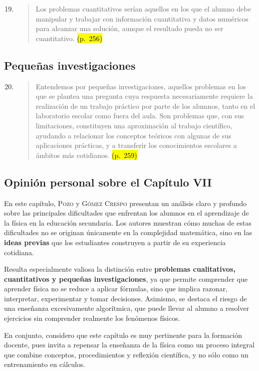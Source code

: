 \documentclass{article}
\begin{document}
\begin{enumerate}
  \setcounter{enumi}{18}
  \item
  \begin{quote}
  Los problemas cuantitativos serían aquellos en los que el alumno debe manipular y trabajar con información cuantitativa y datos numéricos para alcanzar una solución, aunque el resultado pueda no ser cuantitativo. \hl{(p.~256)}
  \end{quote}
\end{enumerate}

\subsection*{Pequeñas investigaciones}

\begin{enumerate}
  \setcounter{enumi}{19}
  \item
  \begin{quote}
  Entendemos por pequeñas investigaciones, aquellos problemas en los que se plantea una pregunta cuya respuesta necesariamente requiere la realización de un trabajo práctico por parte de los alumnos, tanto en el laboratorio escolar como fuera del aula. Son problemas que, con sus limitaciones, constituyen una aproximación al trabajo científico, ayudando a relacionar los conceptos teóricos con algunas de sus aplicaciones prácticas, y a transferir los conocimientos escolares a ámbitos más cotidianos. \hl{(p.~259)}
  \end{quote}
\end{enumerate}

\subsection*{Opinión personal sobre el Capítulo VII}

En este capítulo, \textsc{Pozo} y \textsc{Gómez Crespo} presentan un análisis claro y profundo sobre las principales dificultades que enfrentan los alumnos en el aprendizaje de la física en la educación secundaria. Los autores muestran cómo muchas de estas dificultades no se originan únicamente en la complejidad matemática, sino en las \textbf{ideas previas} que los estudiantes construyen a partir de su experiencia cotidiana.

Resulta especialmente valiosa la distinción entre \textbf{problemas cualitativos, cuantitativos y pequeñas investigaciones}, ya que permite comprender que aprender física no se reduce a aplicar fórmulas, sino que implica razonar, interpretar, experimentar y tomar decisiones. Asimismo, se destaca el riesgo de una enseñanza excesivamente algorítmica, que puede llevar al alumno a resolver ejercicios sin comprender realmente los fenómenos físicos.

En conjunto, considero que este capítulo es muy pertinente para la formación docente, pues invita a repensar la enseñanza de la física como un proceso integral que combine conceptos, procedimientos y reflexión científica, y no sólo como un entrenamiento en cálculos.
\end{document}
